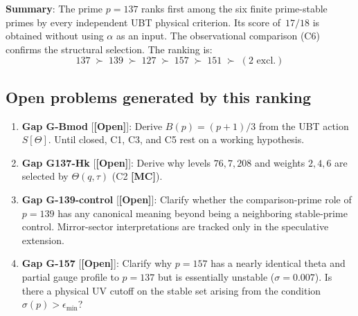 \documentclass[12pt,a4paper]{article}
\theoremstyle{definition}
\theoremstyle{remark}
\newcommand{\OPEN}{\textbf{[Open]}}
\newcommand{\MC}{\textbf{[MC]}}
\begin{document}
\begin{resultbox}
\textbf{Summary}: The prime $p = 137$ ranks first among the six finite
prime-stable primes by every independent UBT physical criterion.  Its score
of~$17/18$ is obtained without using $\alpha$ as an input.  The observational
comparison (C6) confirms the structural selection.  The ranking is:
\[
  \boxed{137 \;\succ\; 139 \;\succ\; 127 \;\succ\; 157 \;\succ\; 151 \;\succ\; (2 \text{ excl.})}
\]
\end{resultbox}

\subsection{Open problems generated by this ranking}

\begin{gapbox}
\begin{enumerate}
  \item \textbf{Gap G-Bmod} [\OPEN]: Derive $B(p) = (p+1)/3$ from the UBT
        action $S[\Theta]$.  Until closed, C1, C3, and C5 rest on a working
        hypothesis.
  \item \textbf{Gap G137-Hk} [\OPEN]: Derive why levels $76, 7, 208$ and
        weights $2, 4, 6$ are selected by $\Theta(q,\tau)$
        (C2 \MC).
  \item \textbf{Gap G-139-control} [\OPEN]: Clarify whether the comparison-prime
        role of $p=139$ has any canonical meaning beyond being a neighboring
        stable-prime control.  Mirror-sector interpretations are tracked only
        in the speculative extension.
  \item \textbf{Gap G-157} [\OPEN]: Clarify why $p = 157$ has a nearly
        identical theta and partial gauge profile to $p = 137$ but is
        essentially unstable ($\sigma = 0.007$).
        Is there a physical UV cutoff on the stable set arising from the
        condition $\sigma(p) > \epsilon_{\mathrm{min}}$?
\end{enumerate}
\end{gapbox}

\ifdefined\INCLUDEMODE
\else
  
\end{document}
